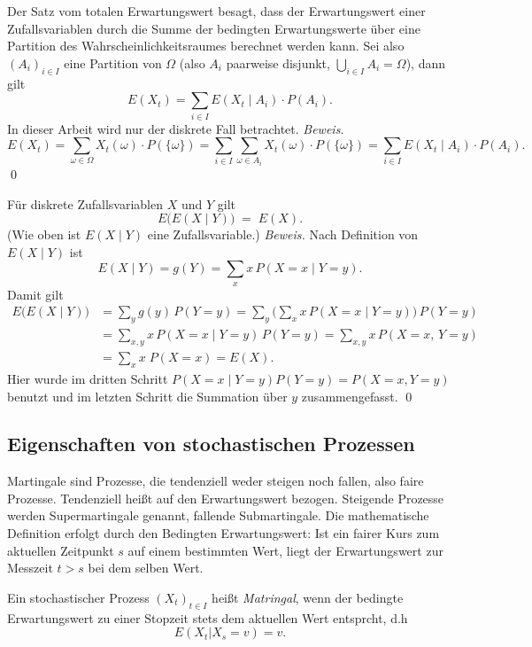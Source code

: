 \begin{satz}
Der Satz vom totalen Erwartungswert besagt, dass der Erwartungswert einer Zufallsvariablen
durch die Summe der bedingten Erwartungswerte über eine Partition des Wahrscheinlichkeitsraumes
berechnet werden kann. Sei also $(A_i)_{i \in I}$ eine Partition von $\Omega$ (also $A_i$ paarweise disjunkt, $\bigcup_{i \in I} A_i = \Omega$),
dann gilt $$E(X_t) = \sum_{i \in I} E(X_t \mid  A_i) \cdot P(A_i).$$
In dieser Arbeit wird nur der diskrete Fall betrachtet. \textit{Beweis.}
$$E(X_t) = \sum_{\omega \in \Omega} X_t(\omega) \cdot P(\{\omega\}) = \sum_{i \in I} \sum_{\omega \in A_i} X_t(\omega) \cdot P(\{\omega\}) = \sum_{i \in I} E(X_t \mid A_i) \cdot P(A_i).$$
\qed

\end{satz}

\begin{satz}
Für diskrete Zufallsvariablen $X$ und $Y$ gilt
$$
E\big(E(X\mid Y)\big)\;=\;E(X).
$$
(Wie oben ist $E(X\mid Y)$ eine Zufallsvariable.)
\textit{Beweis.} Nach Definition von $E(X\mid Y)$ ist $$E(X\mid Y)=g(Y) =\sum_x x\,P(X=x\mid Y=y).$$ Damit gilt
$$
\begin{aligned}
E\big(E(X\mid Y)\big)
&= \sum_y g(y)\,P(Y=y)
= \sum_y \Big(\sum_x x\,P(X=x\mid Y=y)\Big)\,P(Y=y)\\
&= \sum_{x,y} x\,P(X=x\mid Y=y)\,P(Y=y)
= \sum_{x,y} x\,P(X=x,\,Y=y)\\
&= \sum_x x\;P(X=x)
= E(X).
\end{aligned}
$$
Hier wurde im dritten Schritt $P(X=x\mid Y=y)P(Y=y)=P(X=x, Y=y)$ 
benutzt und im letzten Schritt die Summation über $y$ zusammengefasst. \qed

\end{satz}

\subsection{Eigenschaften von stochastischen Prozessen}

\begin{defi}[Martingal]
Martingale sind Prozesse, die tendenziell weder steigen noch fallen, 
also faire Prozesse. Tendenziell heißt auf den Erwartungswert bezogen. 
Steigende Prozesse werden Supermartingale genannt, fallende Submartingale. 
Die mathematische Definition erfolgt durch den Bedingten Erwartungswert: 
Ist ein fairer Kurs zum aktuellen Zeitpunkt $s$ auf einem bestimmten Wert, 
liegt der Erwartungswert zur Messzeit $t \gt s$ bei dem selben Wert.

Ein stochastischer Prozess $(X_t)_{t \in I}$ heißt \textit{Matringal}, 
wenn der bedingte Erwartungswert zu einer Stopzeit stets dem aktuellen Wert entsprcht, d.h $$E(X_t|X_s=v) = v.$$
\end{defi}

